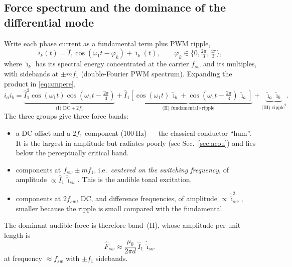 \documentclass[11pt,a4paper,oneside]{book}
\begin{document}
\begin{onehalfspace}
\begin{appendices}
\section{Force spectrum and the dominance of the differential mode}
Write each phase current as a fundamental term plus PWM ripple,
\begin{equation}
	i_k(t)=\hat I_1\cos(\omega_1 t-\varphi_k)+\tilde\imath_k(t),
	\qquad \varphi_k\in\{0,\tfrac{2\pi}{3},\tfrac{4\pi}{3}\},
\end{equation}
where $\tilde\imath_k$ has its spectral energy concentrated at the carrier
$f_{sw}$ and its multiples, with sidebands at $\pm m f_1$ (double-Fourier PWM
spectrum). Expanding the product in \eqref{eq:ampere},
\begin{equation}
	i_a i_b=
	\underbrace{\hat I_1^2\cos(\omega_1 t)\cos(\omega_1 t-\tfrac{2\pi}{3})}_{\text{(I) DC}+2f_1}
	+\underbrace{\hat I_1\!\left[\cos(\omega_1 t)\,\tilde\imath_b+\cos(\omega_1 t-\tfrac{2\pi}{3})\,\tilde\imath_a\right]}_{\text{(II) fundamental}\times\text{ripple}}
	+\underbrace{\tilde\imath_a\tilde\imath_b}_{\text{(III) ripple}^2}.
	\label{eq:expand}
\end{equation}
The three groups give three force bands:
\begin{itemize}[leftmargin=*,nosep]
	\item[(I)] a DC offset and a $2f_1$ component ($100\ \mathrm{Hz}$) --- the
	classical conductor ``hum''. It is the largest in amplitude but radiates poorly
	(see Sec.~\ref{sec:acou}) and lies below the perceptually critical band.
	\item[(II)] components at $f_{sw}\pm m f_1$, i.e.\ \emph{centered on the switching
		frequency}, of amplitude $\propto \hat I_1\,\hat{\tilde\imath}_{sw}$. This is the
	audible tonal excitation.
	\item[(III)] components at $2f_{sw}$, DC, and difference frequencies, of amplitude
	$\propto \hat{\tilde\imath}_{sw}^2$, smaller because the ripple is small compared
	with the fundamental.
\end{itemize}
The dominant audible force is therefore band~(II), whose amplitude per unit length
is
\begin{equation}
	\boxed{\;\hat F_{sw}\approx\frac{\mu_0}{2\pi d}\,\hat I_1\,\hat{\tilde\imath}_{sw}\;}
	\label{eq:Fsw}
\end{equation}
at frequency $\approx f_{sw}$ with $\pm f_1$ sidebands.


\end{appendices}
\end{onehalfspace}
\end{document}
